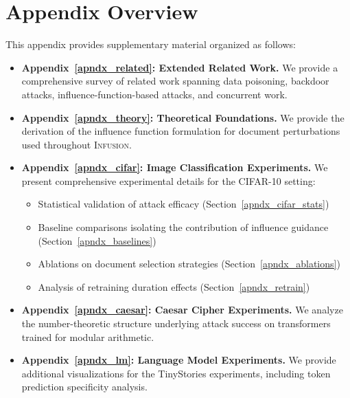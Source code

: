 \documentclass{article} %
\begin{document}
\break
\appendix

\section{Appendix Overview}
\label{apndx_overview}

This appendix provides supplementary material organized as follows:

\begin{itemize}

    \item \textbf{Appendix~\ref{apndx_related}: Extended Related Work.} We provide a comprehensive survey of related work spanning data poisoning, backdoor attacks, influence-function-based attacks, and concurrent work.
    
    \item \textbf{Appendix~\ref{apndx_theory}: Theoretical Foundations.} We provide the derivation of the influence function formulation for document perturbations used throughout \textsc{Infusion}.

    \item \textbf{Appendix~\ref{apndx_cifar}: Image Classification Experiments.} We present comprehensive experimental details for the CIFAR-10 setting:
    \begin{itemize}
        \item Statistical validation of attack efficacy (Section~\ref{apndx_cifar_stats})
        \item Baseline comparisons isolating the contribution of influence guidance (Section~\ref{apndx_baselines})
        \item Ablations on document selection strategies (Section~\ref{apndx_ablations})
        \item Analysis of retraining duration effects (Section~\ref{apndx_retrain})
    \end{itemize}

    \item \textbf{Appendix~\ref{apndx_caesar}: Caesar Cipher Experiments.} We analyze the number-theoretic structure underlying attack success on transformers trained for modular arithmetic.

    \item \textbf{Appendix~\ref{apndx_lm}: Language Model Experiments.} We provide additional visualizations for the TinyStories experiments, including token prediction specificity analysis.

    
\end{itemize}
\end{document}
